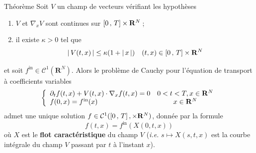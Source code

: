         \begin{omed}{Théorème}
            Soit $V$ un champ de vecteurs vérifiant les hypothèses  
            \begin{enumerate}[label=($h_{\arabic*}$)]
            \item $V$ et $\nabla_x V$ sont continues sur $\left[ 0 \, , \, T \right] \times \mathbf{R}^N$ ;
            \item il existe $\kappa > 0$ tel que 
            \[ \left\lvert \, V(t,x) \, \right\rvert \leq \kappa(1 + \left\lvert \, x \, \right\rvert) \quad (t,x) \in \left[ 0 \, , \, T \right] \times \mathbf{R}^N  \]
        \end{enumerate}
        et soit $f^{\text{in}} \in \mathcal{C}^1(\mathbf{R}^N)$. Alors le problème de Cauchy pour l’équation de transport à coefficients variables 
        \[ \left\{ \begin{array}{lc}
            \partial_t f(t,x) + V(t,x) \cdot \nabla_x f(t,x) = 0 & 0 < t < T, x \in \mathbf{R}^N \\
            f(0,x) = f^{\text{in}}(x) & x \in \mathbf{R}^N
        \end{array} \right. \kern-\nulldelimiterspace \]    
        admet une unique solution $f \in \mathcal{C}^1(\left[ 0 \, , \, T \right], \times \mathbf{R}^N)$, donnée par la formule 
        \[ f(t,x) = f^{\text{in}}(X(0,t,x)) \]   
        où $X$ est le \textbf{flot caractéristique} du champ $V$ (\textit{i.e.} $s \mapsto X(s,t,x)$ est la courbe intégrale du champ $V$ passant par $t$ à l’instant $x$).
        \end{omed}